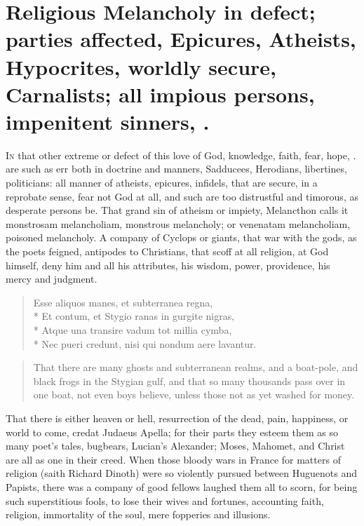 {%

\section[Religious Melancholy in defect]{Religious Melancholy in defect; parties affected, Epicures, Atheists, Hypocrites, worldly secure, Carnalists; all impious persons, impenitent sinners, \etc{}.}

\lettrine{I}{n} that other extreme or defect of this love of God, knowledge, faith,
fear, hope, \etc{}. are such as err both in doctrine and manners,
Sadducees, Herodians, libertines, politicians: all manner of atheists,
epicures, infidels, that are secure, in a reprobate sense, fear not God
at all, and such are too distrustful and timorous, as desperate persons
be. That grand sin of atheism or impiety, Melancthon calls it
monstrosam melancholiam, monstrous melancholy; or venenatam
melancholiam, poisoned melancholy. A company of Cyclops or giants, that
war with the gods, as the poets feigned, antipodes to Christians, that
scoff at all religion, at God himself, deny him and all his attributes,
his wisdom, power, providence, his mercy and judgment.

\begin{latin}
\begin{verse}
Esse aliquos manes, et subterranea regna,\\*
Et contum, et Stygio ranas in gurgite nigras,\\*
Atque una transire vadum tot millia cymba,\\*
Nec pueri credunt, nisi qui nondum aere lavantur.
\end{verse}
\end{latin}

\begin{quote}
 That there are many ghosts and subterranean realms, and a boat-pole, and black frogs in the Stygian gulf, and that so many thousands pass over in one boat, not even boys believe, unless those not as yet washed for money.
\end{quote}

That there is either heaven or hell, resurrection of the dead, pain,
happiness, or world to come, credat Judaeus Apella; for their parts
they esteem them as so many poet's tales, bugbears, Lucian's Alexander;
Moses, Mahomet, and Christ are all as one in their creed. When those
bloody wars in France for matters of religion (saith Richard
Dinoth) were so violently pursued between Huguenots and Papists, there
was a company of good fellows laughed them all to scorn, for being such
superstitious fools, to lose their wives and fortunes, accounting
faith, religion, immortality of the soul, mere fopperies and illusions.

}
